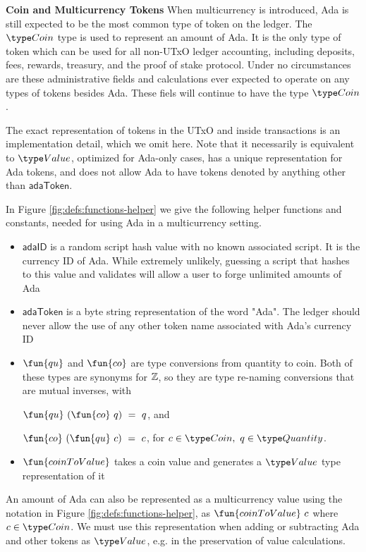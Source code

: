\textbf{Coin and Multicurrency Tokens}
When multicurrency is introduced, Ada is still expected to be
the most common type of token on the ledger.
The $\Coin$ type is used to represent an amount of Ada.
It is the only
type of token which can be used for all non-UTxO ledger accounting, including deposits,
fees, rewards, treasury, and the proof of stake protocol. Under no circumstances
are these administrative fields and calculations ever expected to operate on
any types of tokens besides Ada. These fiels will continue to have the type $\Coin$.

The exact representation of tokens in the UTxO and inside transactions
is an implementation detail, which we omit here.
Note that it necessarily is equivalent to $\Value$, optimized
for Ada-only cases, has a unique representation for Ada tokens,
and does not allow Ada to have tokens denoted by anything other than $\mathsf{adaToken}$.

In Figure \ref{fig:defs:functions-helper} we give the following helper functions
and constants, needed for using Ada in a multicurrency setting.

\begin{itemize}
  \item $\mathsf{adaID}$ is a random script hash value with no known associated
  script. It is the currency ID of Ada. While extremely unlikely, guessing a
  script that hashes to this value
  and validates will allow a user to forge unlimited amounts of Ada
  \item $\mathsf{adaToken}$ is a byte string representation of the word "Ada".
  The ledger should never allow the use of any other token name associated
  with Ada's currency ID
  \item $\fun{qu}$ and $\fun{co}$ are type conversions from quantity to
  coin. Both of these types are synonyms for $\mathbb{Z}$, so they are
  type re-naming conversions that are mutual inverses, with

  $\fun{qu} ~(\fun{co} ~q )~= ~q$, and

  $\fun{co}~ (\fun{qu}~ c) ~=~ c$, for $c \in \Coin,~q \in \Quantity$.

  \item $\fun{coinToValue}$ takes a coin value and generates a $\Value$ type representation
  of it
\end{itemize}

An amount of Ada can also be represented as a multicurrency value
using the notation in Figure \ref{fig:defs:functions-helper}, as
$\fun{coinToValue}~c$ where $c \in \Coin$. We must use this representation
when adding or subtracting Ada and other tokens as $\Value$, e.g. in the
preservation of value calculations.

